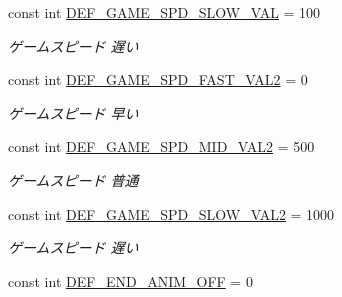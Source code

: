 \begin{DoxyCompactItemize}
\mbox{\label{class_reversi_form_1_1_reversi_const_a36ca86d301a4c9ba4163cc3748055fa2}} 
const int \hyperlink{class_reversi_form_1_1_reversi_const_a36ca86d301a4c9ba4163cc3748055fa2}{D\+E\+F\+\_\+\+G\+A\+M\+E\+\_\+\+S\+P\+D\+\_\+\+S\+L\+O\+W\+\_\+\+V\+AL} = 100
\begin{DoxyCompactList}\small\item\em ゲームスピード 遅い \end{DoxyCompactList}\item 
\mbox{\label{class_reversi_form_1_1_reversi_const_ab6a854706b7df749a64927c96604e93b}} 
const int \hyperlink{class_reversi_form_1_1_reversi_const_ab6a854706b7df749a64927c96604e93b}{D\+E\+F\+\_\+\+G\+A\+M\+E\+\_\+\+S\+P\+D\+\_\+\+F\+A\+S\+T\+\_\+\+V\+A\+L2} = 0
\begin{DoxyCompactList}\small\item\em ゲームスピード 早い \end{DoxyCompactList}\item 
\mbox{\label{class_reversi_form_1_1_reversi_const_aa592855c2bfebcee79817d24707b5312}} 
const int \hyperlink{class_reversi_form_1_1_reversi_const_aa592855c2bfebcee79817d24707b5312}{D\+E\+F\+\_\+\+G\+A\+M\+E\+\_\+\+S\+P\+D\+\_\+\+M\+I\+D\+\_\+\+V\+A\+L2} = 500
\begin{DoxyCompactList}\small\item\em ゲームスピード 普通 \end{DoxyCompactList}\item 
\mbox{\label{class_reversi_form_1_1_reversi_const_aee73581f1c40ddddf4458e340fd8b25e}} 
const int \hyperlink{class_reversi_form_1_1_reversi_const_aee73581f1c40ddddf4458e340fd8b25e}{D\+E\+F\+\_\+\+G\+A\+M\+E\+\_\+\+S\+P\+D\+\_\+\+S\+L\+O\+W\+\_\+\+V\+A\+L2} = 1000
\begin{DoxyCompactList}\small\item\em ゲームスピード 遅い \end{DoxyCompactList}\item 
\mbox{\label{class_reversi_form_1_1_reversi_const_aef995c3f17fb18c5617e02617e688d27}} 
const int \hyperlink{class_reversi_form_1_1_reversi_const_aef995c3f17fb18c5617e02617e688d27}{D\+E\+F\+\_\+\+E\+N\+D\+\_\+\+A\+N\+I\+M\+\_\+\+O\+FF} = 0

\end{DoxyCompactItemize}
